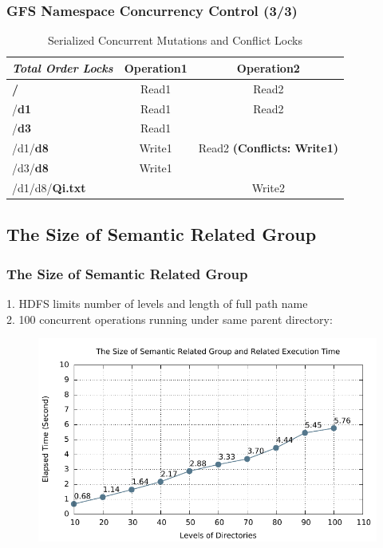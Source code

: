 \documentclass{beamer}
\begin{document}
\begin{frame}
	\frametitle{GFS Namespace Concurrency Control (3/3)}
		\begin{table}[ht]
			\centering
			\begin{tabular}{|l|c|c|}
				\hline
				\textbf{\textit{Total Order Locks}}             & \textbf{Operation1} & \textbf{Operation2}                    \\ \hline
				\textbf{\color{red}/}             & Read1      & Read2                         \\ \hline
				/\textbf{\color{red}d1}           & Read1      & Read2                         \\ \hline
				/\textbf{\color{red}d3}           & Read1      & ~                             \\ \hline
				/d1/\textbf{\color{red}d8}        & Write1     & Read2 \textbf{(Conflicts: Write1)} \\ \hline
				/d3/\textbf{\color{red}d8}       & Write1     & ~                             \\ \hline
				/d1/d8/\textbf{\color{red}Qi.txt} & ~          & Write2                        \\ \hline
			\end{tabular}
			\caption{Serialized Concurrent Mutations and Conflict Locks}
		\end{table}
\end{frame}

\subsection{The Size of Semantic Related Group}
\begin{frame}
	\frametitle{The Size of Semantic Related Group}
	1. HDFS limits number of levels and length of full path name \\
	2. 100 concurrent operations running under same parent directory:
	\begin{figure}[ht]
		\centering
		\includegraphics[width=\linewidth]{figs/srgSize.pdf}
	\end{figure}
\end{frame}
\end{document}

